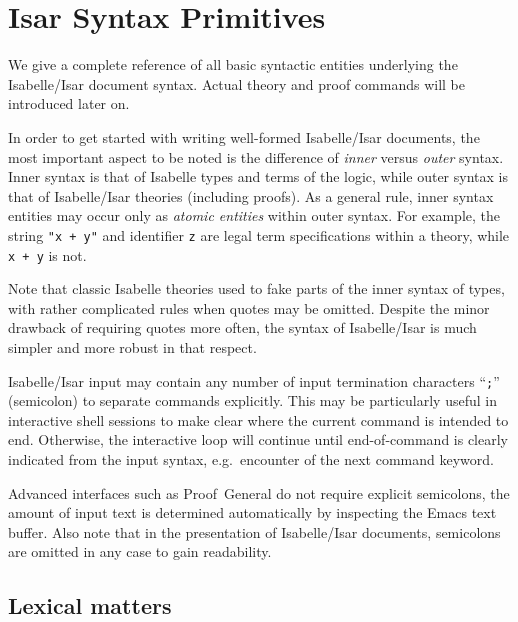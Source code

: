 
\chapter{Isar Syntax Primitives}

We give a complete reference of all basic syntactic entities underlying the
Isabelle/Isar document syntax.  Actual theory and proof commands will be
introduced later on.

\medskip

In order to get started with writing well-formed Isabelle/Isar documents, the
most important aspect to be noted is the difference of \emph{inner} versus
\emph{outer} syntax.  Inner syntax is that of Isabelle types and terms of the
logic, while outer syntax is that of Isabelle/Isar theories (including
proofs).  As a general rule, inner syntax entities may occur only as
\emph{atomic entities} within outer syntax.  For example, the string
\texttt{"x + y"} and identifier \texttt{z} are legal term specifications
within a theory, while \texttt{x + y} is not.

\begin{warn}
  Note that classic Isabelle theories used to fake parts of the inner syntax
  of types, with rather complicated rules when quotes may be omitted.  Despite
  the minor drawback of requiring quotes more often, the syntax of
  Isabelle/Isar is much simpler and more robust in that respect.
\end{warn}

\medskip

Isabelle/Isar input may contain any number of input termination characters
``\texttt{;}'' (semicolon) to separate commands explicitly.  This may be
particularly useful in interactive shell sessions to make clear where the
current command is intended to end.  Otherwise, the interactive loop will
continue until end-of-command is clearly indicated from the input syntax,
e.g.\ encounter of the next command keyword.

Advanced interfaces such as Proof~General \cite{proofgeneral} do not require
explicit semicolons, the amount of input text is determined automatically by
inspecting the Emacs text buffer.  Also note that in the presentation of
Isabelle/Isar documents, semicolons are omitted in any case to gain
readability.


\section{Lexical matters}\label{sec:lex-syntax}

